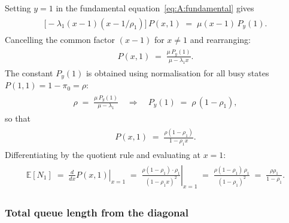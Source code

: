 \documentclass{article}
\numberwithin{equation}{section}
\begin{document}
Setting $y=1$ in the fundamental equation~\eqref{eq:A:fundamental} gives
\begin{align*}
    \begin{split}
        \bigl[-\lambda_1(x-1)(x-1/\rho_1)\bigr]\,P(x,1)
        \;=\; \mu(x-1)\,P_y(1).
    \end{split}
\end{align*}
Cancelling the common factor $(x-1)$ for $x\neq1$ and rearranging:
\begin{align*}
    \begin{split}
        P(x,1) \;=\; \frac{\mu\,P_y(1)}{\mu-\lambda_1 x}.
    \end{split}
\end{align*}
The constant $P_y(1)$ is obtained using normalisation for all busy states $P(1,1)=1-\pi_0=\rho$:
\begin{align*}
    \begin{split}
        \rho \;=\; \frac{\mu\,P_y(1)}{\mu-\lambda_1}
        \quad\Longrightarrow\quad
        P_y(1) \;=\; \rho\,(1-\rho_1),
    \end{split}
\end{align*}
so that
\begin{align*}
    \begin{split}
        P(x,1) \;=\; \frac{\rho(1-\rho_1)}{1-\rho_1 x}.
    \end{split}
\end{align*}
Differentiating by the quotient rule and evaluating at $x=1$:
\begin{align}
    \begin{split}
        \mathbb{E}[N_1]
        \;=\; \left.\frac{d}{dx}P(x,1)\right|_{x=1}
        \;=\; \left.\frac{\rho(1-\rho_1)\cdot\rho_1}{(1-\rho_1 x)^2}\right|_{x=1}
        \;=\; \frac{\rho(1-\rho_1)\,\rho_1}{(1-\rho_1)^2}
        \;=\; \frac{\rho\rho_1}{1-\rho_1}.
    \end{split}
    \label{eq:A:EN1}
\end{align}

\subsubsection{Total queue length from the diagonal}
\end{document}

